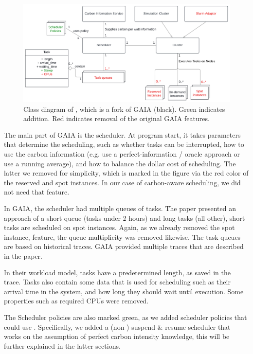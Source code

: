 \begin{figure}
    \includegraphics[width=\linewidth]{images/MA Thesis Diagram.pdf}
    \caption{Class diagram of \programname{}, which is a fork of GAIA (black). Green indicates addition. Red indicates removal of the original GAIA features.}
    \label{fig:class_diagram}
\end{figure}

The main part of GAIA is the scheduler. At program start, it takes parameters that determine the scheduling, such as whether tasks can be interrupted, how to use the carbon information (e.g. use a perfect-information / oracle approach or use a running average), and how to balance the dollar cost of scheduling. 
The latter we removed for simplicity, which is marked in the figure via the red color of the reserved and spot instances. In our case of carbon-aware scheduling, we did not need that feature.

In GAIA, the scheduler had multiple queues of tasks. 
The paper presented an approach of a short queue (tasks under 2 hours) and long tasks (all other), short tasks are scheduled on spot instances. 
Again, as we already removed the spot instance, feature, the queue multiplicity was removed likewise.
The task queues are based on historical traces. GAIA provided multiple traces that are described in the paper.

In their workload model, tasks have a predetermined length, as saved in the trace. 
Tasks also contain some data that is used for scheduling such as their arrival time in the system, and how long they should wait until execution. 
Some properties such as required CPUs were removed.

The Scheduler policies are also marked green, as we added scheduler policies that could use \modelname. Specifically, we added a (non-) suspend \& resume scheduler that works on the assumption of perfect carbon intensity knowledge, this will be further explained in the latter sections.


